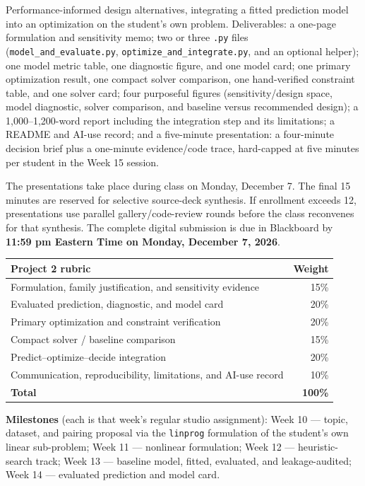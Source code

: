 \documentclass[11pt]{article}
\begin{document}
Performance-informed design alternatives, integrating a fitted prediction model into an
optimization on the student's own problem. Deliverables: a one-page formulation and sensitivity
memo; two or three \texttt{.py} files (\texttt{model\_and\_evaluate.py},
\texttt{optimize\_and\_integrate.py}, and an optional helper); one model metric table, one
diagnostic figure, and one model card; one primary optimization result, one compact solver
comparison, one hand-verified constraint table, and one solver card; four purposeful figures
(sensitivity/design space, model diagnostic, solver comparison, and baseline versus
recommended design); a 1,000--1,200-word report including the integration step and its
limitations; a README and AI-use record; and a five-minute presentation: a four-minute
decision brief plus a one-minute evidence/code trace, hard-capped at five minutes per
student in the Week 15 session.

The presentations take place during class on Monday, December 7. The final 15 minutes are
reserved for selective source-deck synthesis. If enrollment exceeds 12, presentations use
parallel gallery/code-review rounds before the class reconvenes for that synthesis.
The complete digital submission is due in Blackboard by \textbf{11:59 pm Eastern Time on
Monday, December 7, 2026}.

\begin{center}
\begin{tabular}{@{}lr@{}}
\toprule
\textbf{Project 2 rubric} & \textbf{Weight} \\
\midrule
Formulation, family justification, and sensitivity evidence & 15\% \\
Evaluated prediction, diagnostic, and model card            & 20\% \\
Primary optimization and constraint verification            & 20\% \\
Compact solver / baseline comparison                        & 15\% \\
Predict--optimize--decide integration                       & 20\% \\
Communication, reproducibility, limitations, and AI-use record & 10\% \\
\midrule
\textbf{Total} & \textbf{100\%} \\
\bottomrule
\end{tabular}
\end{center}

\textbf{Milestones} (each is that week's regular studio assignment): Week 10 --- topic,
dataset, and pairing proposal via the \texttt{linprog} formulation of the student's own linear
sub-problem; Week 11 --- nonlinear formulation; Week 12 --- heuristic-search track; Week 13 ---
baseline model, fitted, evaluated, and leakage-audited; Week 14 --- evaluated prediction and
model card.
\end{document}
